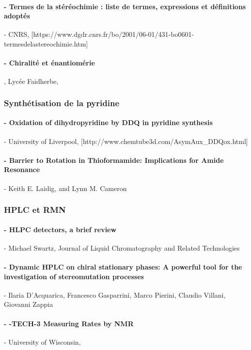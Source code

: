 \documentclass{article}
\begin{document}
\paragraph{- \quad Termes de la stéréochimie : liste de termes, expressions et définitions adoptés} - CNRS, [https://www.dgdr.cnrs.fr/bo/2001/06-01/431-bo0601-termesdelastereochimie.htm]

\paragraph{- \quad Chiralité et énantiomérie}, Lycée Faidherbe,  \par [https://www.faidherbe.org/site/cours/dupuis/enantio.htm]


\subsubsection*{Synthétisation de la pyridine}

\paragraph{- \quad Oxidation of dihydropyridine by DDQ in pyridine synthesis} - University of Liverpool, [http://www.chemtube3d.com/AsymAux\_DDQox.html]

\paragraph{- \quad Barrier to Rotation in Thioformamide: Implications for Amide Resonance} - Keith E. Laidig, and Lynn M. Cameron

\subsubsection*{HPLC et RMN}

\paragraph{- \quad HLPC detectors, a brief review} - Michael Swartz, Journal of Liquid Chromatography and Related Technologies

\paragraph{- \quad Dynamic HPLC on chiral stationary phases:
A powerful tool for the investigation of
stereomutation processes} - Ilaria D’Acquarica, Francesco Gasparrini, Marco Pierini, Claudio Villani, Giovanni Zappia

\paragraph{- -TECH-3 Measuring Rates by NMR} - University of Wisconsin, \par [https://www.chem.wisc.edu/areas/reich/nmr/08-tech-03-dnmr.htm]
\end{document}
